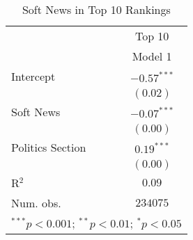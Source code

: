 
\begin{table}[H]
\caption{Soft News in Top 10 Rankings}
\begin{center}
\begin{tabular}{l c}
\hline
 & \multicolumn{1}{c}{Top 10} \\
\cline{2-2}
 & Model 1 \\
\hline
Intercept        & $-0.57^{***}$ \\
                 & $(0.02)$      \\
Soft News        & $-0.07^{***}$ \\
                 & $(0.00)$      \\
Politics Section & $0.19^{***}$  \\
                 & $(0.00)$      \\
\hline
R$^2$            & $0.09$        \\
Num. obs.        & $234075$      \\
\hline
\multicolumn{2}{l}{\scriptsize{$^{***}p<0.001$; $^{**}p<0.01$; $^{*}p<0.05$}}
\end{tabular}
\label{tab:quasi_experiment}
\end{center}
\end{table}
